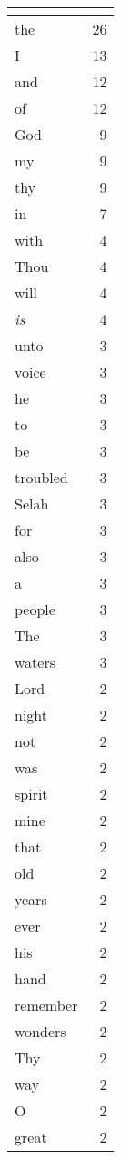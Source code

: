 \begin{center}
\begin{longtable}{l|r}
\hline \multicolumn{2}{c}{{ }} \\ \hline
\endfoot 
the & 26\\ \hline 
I & 13\\ \hline 
and & 12\\ \hline 
of & 12\\ \hline 
God & 9\\ \hline 
my & 9\\ \hline 
thy & 9\\ \hline 
in & 7\\ \hline 
with & 4\\ \hline 
Thou & 4\\ \hline 
will & 4\\ \hline 
\emph{is} & 4\\ \hline 
unto & 3\\ \hline 
voice & 3\\ \hline 
he & 3\\ \hline 
to & 3\\ \hline 
be & 3\\ \hline 
troubled & 3\\ \hline 
Selah & 3\\ \hline 
for & 3\\ \hline 
also & 3\\ \hline 
a & 3\\ \hline 
people & 3\\ \hline 
The & 3\\ \hline 
waters & 3\\ \hline 
Lord & 2\\ \hline 
night & 2\\ \hline 
not & 2\\ \hline 
was & 2\\ \hline 
spirit & 2\\ \hline 
mine & 2\\ \hline 
that & 2\\ \hline 
old & 2\\ \hline 
years & 2\\ \hline 
ever & 2\\ \hline 
his & 2\\ \hline 
hand & 2\\ \hline 
remember & 2\\ \hline 
wonders & 2\\ \hline 
Thy & 2\\ \hline 
way & 2\\ \hline 
O & 2\\ \hline 
great & 2\\ \hline 

\end{longtable}
\end{center}
